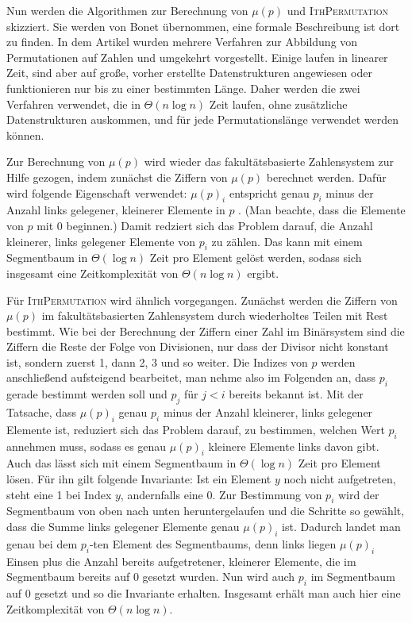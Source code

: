\documentclass[a4paper, 10pt, ngerman]{article}
\begin{document}
Nun werden die Algorithmen zur Berechnung von $\mu(p)$ und \textsc{IthPermutation} skizziert. Sie werden von Bonet \cite{permutationranking} übernommen, eine formale Beschreibung ist dort zu finden. In dem Artikel wurden mehrere Verfahren zur Abbildung von Permutationen auf Zahlen und umgekehrt vorgestellt. Einige laufen in linearer Zeit, sind aber auf große, vorher erstellte Datenstrukturen angewiesen oder funktionieren nur bis zu einer bestimmten Länge. Daher werden die zwei Verfahren verwendet, die in $\Theta(n \log n)$ Zeit laufen, ohne zusätzliche Datenstrukturen auskommen, und für jede Permutationslänge verwendet werden können.

Zur Berechnung von $\mu(p)$ wird wieder das fakultätsbasierte Zahlensystem zur Hilfe gezogen, indem zunächst die Ziffern von $\mu(p)$ berechnet werden. Dafür wird folgende Eigenschaft verwendet: $\mu(p)_i$ entspricht genau $p_i$ minus der Anzahl links gelegener, kleinerer Elemente in $p$ \cite{permutationranking}. (Man beachte, dass die Elemente von $p$ mit 0 beginnen.) Damit redziert sich das Problem darauf, die Anzahl kleinerer, links gelegener Elemente von $p_i$ zu zählen. Das kann mit einem Segmentbaum in $\Theta(\log n)$ Zeit pro Element gelöst werden, sodass sich insgesamt eine Zeitkomplexität von $\Theta(n \log n)$ ergibt.

Für \textsc{IthPermutation} wird ähnlich vorgegangen. Zunächst werden die Ziffern von $\mu(p)$ im fakultätsbasierten Zahlensystem durch wiederholtes Teilen mit Rest bestimmt. Wie bei der Berechnung der Ziffern einer Zahl im Binärsystem sind die Ziffern die Reste der Folge von Divisionen, nur dass der Divisor nicht konstant ist, sondern zuerst 1, dann 2, 3 und so weiter. Die Indizes von $p$ werden anschließend aufsteigend bearbeitet, man nehme also im Folgenden an, dass $p_i$ gerade bestimmt werden soll und $p_j$ für $j < i$ bereits bekannt ist. Mit der Tatsache, dass $\mu(p)_i$ genau $p_i$ minus der Anzahl kleinerer, links gelegener Elemente ist, reduziert sich das Problem darauf, zu bestimmen, welchen Wert $p_i$ annehmen muss, sodass es genau $\mu(p)_i$ kleinere Elemente links davon gibt. Auch das lässt sich mit einem Segmentbaum in $\Theta(\log n)$ Zeit pro Element lösen. Für ihn gilt folgende Invariante: Ist ein Element $y$ noch nicht aufgetreten, steht eine 1 bei Index $y$, andernfalls eine 0. Zur Bestimmung von $p_i$ wird der Segmentbaum von oben nach unten heruntergelaufen und die Schritte so gewählt, dass die Summe links gelegener Elemente genau $\mu(p)_i$ ist. Dadurch landet man genau bei dem $p_i$-ten Element des Segmentbaums, denn links liegen $\mu(p)_i$ Einsen plus die Anzahl bereits aufgetretener, kleinerer Elemente, die im Segmentbaum bereits auf 0 gesetzt wurden. Nun wird auch $p_i$ im Segmentbaum auf 0 gesetzt und so die Invariante erhalten. Insgesamt erhält man auch hier eine Zeitkomplexität von $\Theta(n \log n)$.
\medskip
\end{document}
